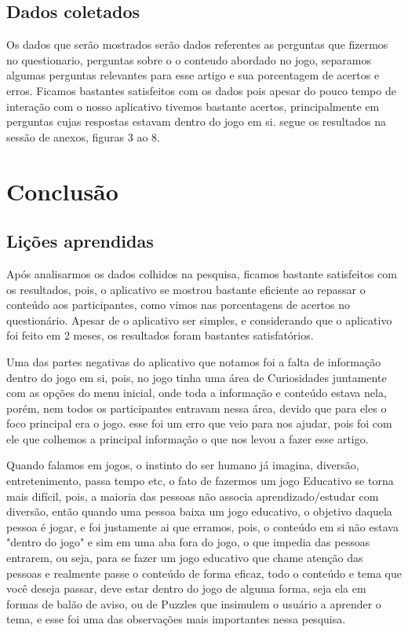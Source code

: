 \documentclass[12pt]{article}
\begin{document}
		
		
		
	\subsection{Dados coletados} %
		Os dados que serão mostrados serão dados referentes as perguntas que fizermos no questionario, perguntas sobre o  o conteudo abordado no jogo, separamos algumas perguntas relevantes para esse artigo e sua porcentagem de acertos e erros. Ficamos bastantes satisfeitos com os dados pois apesar do pouco tempo de interação com o nosso aplicativo tivemos bastante acertos, principalmente em perguntas cujas respostas estavam dentro do jogo em si. segue os resultados na sessão de anexos, figuras 3 ao 8. 
	
	
	\section{Conclusão}%
	\subsection{Lições aprendidas}
		Após analisarmos os dados colhidos na pesquisa, ficamos bastante satisfeitos com os resultados, pois, o aplicativo se mostrou bastante eficiente ao repassar o conteúdo aos participantes, como vimos nas porcentagens de acertos no questionário. Apesar de o aplicativo ser simples, e considerando que o aplicativo foi feito em 2 meses, os resultados foram bastantes satisfatórios.
		
		Uma das partes negativas do aplicativo que notamos foi a falta de informação dentro do jogo em si, pois, no jogo tinha uma área de Curiosidades juntamente com as opções do menu inicial, onde toda a informação e conteúdo estava nela, porém, nem todos os participantes entravam nessa área, devido que para eles o foco principal era o jogo. esse foi um erro que veio para nos ajudar, pois foi com ele que colhemos a principal informação o que nos levou a fazer esse artigo.
		
		Quando falamos em jogos, o instinto do ser humano já imagina, diversão, entretenimento, passa tempo etc, o fato de fazermos um jogo Educativo se torna mais difícil, pois, a maioria das pessoas não associa aprendizado/estudar com diversão, então quando uma pessoa baixa um jogo educativo, o objetivo daquela pessoa é jogar, e foi justamente ai que erramos, pois, o conteúdo em si não estava "dentro do jogo" e sim em uma aba fora do jogo, o que impedia das pessoas entrarem, ou seja, para se fazer um jogo educativo que chame atenção das pessoas e realmente passe o conteúdo de forma eficaz, todo o conteúdo e tema que você deseja passar, deve estar dentro do jogo de alguma forma, seja ela em formas de balão de aviso, ou de Puzzles que insimulem o usuário a aprender o tema, e esse foi uma das observações mais importantes nessa pesquisa.
	
\end{document}
